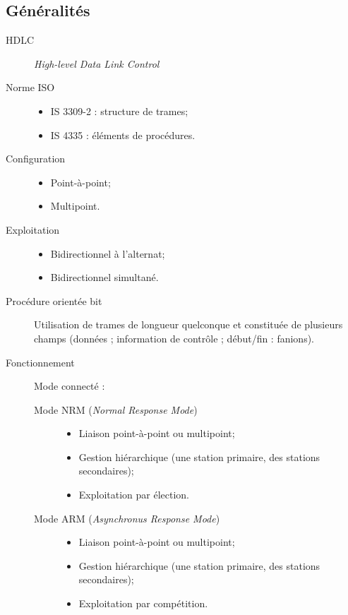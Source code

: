 \documentclass[11pt,english,french]{scrreprt}
\theoremstyle{remark}
\theoremstyle{definition}
\begin{document}
\subsection{Généralités} %

\begin{description}
	\item [HDLC] \emph{High-level Data Link Control}
	\item[Norme ISO] \hfill\begin{itemize}
		\item IS 3309-2 : structure de trames;
		\item IS 4335 : éléments de procédures.
	\end{itemize}
	\item[Configuration] \hfill\begin{itemize}
		\item Point-à-point;
		\item Multipoint.
	\end{itemize}
	\item[Exploitation] \hfill\begin{itemize}
		\item Bidirectionnel à l'alternat;
		\item Bidirectionnel simultané.
	\end{itemize}
	\item[Procédure orientée bit] Utilisation de trames de longueur quelconque et constituée de plusieurs champs (données ; information de contrôle ; début/fin : fanions).
	\item[Fonctionnement] Mode connecté :\begin{description}
		\item [Mode NRM (\emph{Normal Response Mode})] \hfill\begin{itemize}
			\item Liaison point-à-point ou multipoint;
			\item Gestion hiérarchique (une station primaire, des stations secondaires);
			\item Exploitation par élection.
		\end{itemize}
		\item [Mode ARM (\emph{Asynchronus Response Mode})] \hfill\begin{itemize}
			\item Liaison point-à-point ou multipoint;
			\item Gestion hiérarchique (une station primaire, des stations secondaires);
			\item Exploitation par compétition.

\end{itemize}
\end{description}
\end{description}
\end{document}
